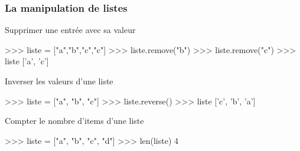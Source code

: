 \begin{frame}[fragile]
\frametitle{La manipulation de listes}

\begin{minipage}[t]{0.38\linewidth}
Supprimer une entrée avec sa valeur
\end{minipage}\hfill
\begin{minipage}[t]{0.58\linewidth}
\vspace{-0.5cm}
\begin{GrayBox}[0.85\textwidth]
\begin{verbatimtab}[3]
>>> liste = ["a","b","c","c"]
>>> liste.remove("b")
>>> liste.remove("c")
>>> liste
['a', 'c']
\end{verbatimtab}
\end{GrayBox}
\end{minipage}

\begin{minipage}[t]{0.38\linewidth}
Inverser les valeurs d'une liste
\end{minipage}\hfill
\begin{minipage}[t]{0.58\linewidth}
\vspace{-0.5cm}
\begin{GrayBox}[0.85\textwidth]
\begin{verbatimtab}[3]
>>> liste = ["a", "b", "c"]
>>> liste.reverse()
>>> liste
['c', 'b', 'a']
\end{verbatimtab}
\end{GrayBox}
\end{minipage}

\begin{minipage}[t]{0.38\linewidth}
Compter le nombre d'items d'une liste
\end{minipage}\hfill
\begin{minipage}[t]{0.58\linewidth}
\vspace{-0.5cm}
\begin{GrayBox}[0.85\textwidth]
\begin{verbatimtab}[3]
>>> liste = ["a", "b", "c", "d"]
>>> len(liste)
4
\end{verbatimtab}
\end{GrayBox}
\end{minipage}
\end{frame}

